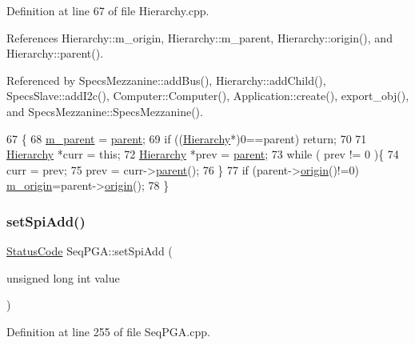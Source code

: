 Definition at line 67 of file Hierarchy.\+cpp.



References Hierarchy\+::m\+\_\+origin, Hierarchy\+::m\+\_\+parent, Hierarchy\+::origin(), and Hierarchy\+::parent().



Referenced by Specs\+Mezzanine\+::add\+Bus(), Hierarchy\+::add\+Child(), Specs\+Slave\+::add\+I2c(), Computer\+::\+Computer(), Application\+::create(), export\+\_\+obj(), and Specs\+Mezzanine\+::\+Specs\+Mezzanine().


\begin{DoxyCode}
67                                               \{
68   \hyperlink{classHierarchy_a5814bb280d4e8539ab25ab6cbfb9cc4f}{m\_parent} = \hyperlink{classHierarchy_a1c7bec8257e717f9c1465e06ebf845fc}{parent};
69   \textcolor{keywordflow}{if} ((\hyperlink{classHierarchy}{Hierarchy}*)0==parent) \textcolor{keywordflow}{return};
70 
71   \hyperlink{classHierarchy}{Hierarchy} *curr = \textcolor{keyword}{this};
72   \hyperlink{classHierarchy}{Hierarchy} *prev = \hyperlink{classHierarchy_a1c7bec8257e717f9c1465e06ebf845fc}{parent};
73   \textcolor{keywordflow}{while} ( prev != 0 )\{
74     curr = prev;
75     prev = curr->\hyperlink{classHierarchy_a1c7bec8257e717f9c1465e06ebf845fc}{parent}();
76   \}
77   \textcolor{keywordflow}{if} (parent->\hyperlink{classHierarchy_aee461dc930ce3871636ff87f075b1b83}{origin}()!=0) \hyperlink{classHierarchy_a16c73e557d3a7c156ffb5dc4102d148e}{m\_origin}=parent->\hyperlink{classHierarchy_aee461dc930ce3871636ff87f075b1b83}{origin}();
78 \}
\end{DoxyCode}
\mbox{\label{classSeqPGA_ac998ce3a6d9b5f2e88cc8393f8c1df53}} 
\subsubsection{\texorpdfstring{set\+Spi\+Add()}{setSpiAdd()}}
{\footnotesize\ttfamily \hyperlink{classStatusCode}{Status\+Code} Seq\+P\+G\+A\+::set\+Spi\+Add (\begin{DoxyParamCaption}\item[{unsigned long int}]{value }\end{DoxyParamCaption})}



Definition at line 255 of file Seq\+P\+G\+A.\+cpp.




